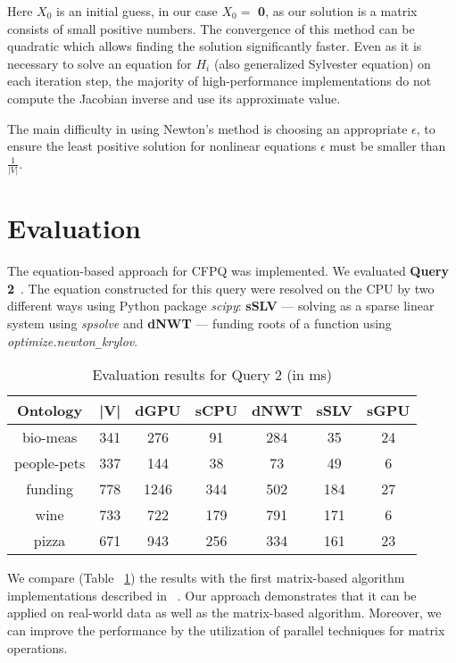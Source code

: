 \documentclass[sigconf]{acmart}
\begin{document}
Here $X_0$ is an initial guess, in our case $X_0 = $ \textbf{0}, as our solution is a matrix consists of small positive numbers. 
The convergence of this method can be quadratic which allows finding the solution significantly faster.
Even as it is necessary to solve an equation for $H_i$ (also generalized Sylvester equation) on each iteration step, the majority of high-performance implementations do not compute the Jacobian inverse and use its approximate value.

The main difficulty in using Newton's method is choosing an appropriate $\epsilon$, to ensure the least positive solution for nonlinear equations $\epsilon$ must be smaller than $\frac{1}{|V|}$.


\section{Evaluation}

The equation-based approach for CFPQ was implemented.
We evaluated \textbf{Query 2}~\cite{azimov2018context}.
The equation constructed for this query were resolved on the CPU by two different ways using Python package \textit{scipy}: 
\textbf{sSLV} --- solving as a sparse linear system using \textit{spsolve}
and
\textbf{dNWT} --- funding roots of a function using \textit{optimize.newton\texttt{\_}krylov}.

\begin{table}[h]
\centering
\caption{Evaluation results for Query 2 (in ms)}
\label{tbl2}

\begin{tabular}{ | c | c | c | c | c | c | c |}
\hline
Ontology & |V| & dGPU & sCPU & dNWT & sSLV & sGPU \\
\hline 
\hline
bio-meas & 341 & 276 & 91 & 284 & 35 & 24\\
people-pets & 337 & 144 & 38 & 73 & 49 & 6\\
funding & 778 & 1246 & 344 & 502 & 184 & 27\\
wine  & 733 & 722 & 179 & 791 & 171 & 6\\
pizza  & 671 & 943 & 256 & 334 & 161 & 23\\
\hline
\end{tabular}

\end{table}

We compare (Table ~\ref{tbl2}) the results with the first matrix-based algorithm implementations described in ~\cite{azimov2018context}. 
Our approach demonstrates that it can be applied on real-world data as well as the matrix-based algorithm. 
Moreover, we can improve the performance by the utilization of parallel techniques for matrix operations.
\end{document}
